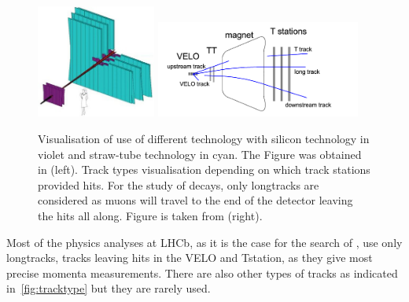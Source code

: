 \begin{figure}[!h]
	\centering
	\includegraphics[width = 0.35\textwidth]{figs/detector/trackingsystem.jpg}%
	\includegraphics[width = 0.6\textwidth]{figs/detector/tracktype.png}
	\caption{ Visualisation of use of different technology with silicon technology in violet and straw-tube technology in cyan. The Figure was obtained in \cite{OT}(left). Track types visualisation depending on which track stations provided hits. For the study of \Bmumumu decays, only \gls{longtrack}s are considered as muons will travel to the end of the detector leaving the hits all along. Figure is taken from \cite{LHCb-DP-2013-002} (right).}
	\label{fig:tracktype}
\end{figure}


Most of the physics analyses at \gls{LHCb}, as it is the case for the search of \Bmumumu, use only \gls{longtrack}s, tracks leaving hits in the \Gls{VELO} and \Gls{Tstation}, as they give most precise momenta measurements. There are also other types of tracks as indicated in~\autoref{fig:tracktype} but they are rarely used.

